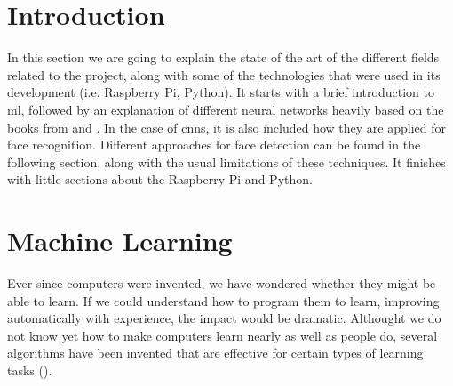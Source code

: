 
\section{Introduction}
In this section we are going to explain the state of the art of the different fields related to the project, along with some of the technologies that were used in its development (i.e. Raspberry Pi, Python). It starts with a brief introduction to \gls{ml}, followed by an explanation of different neural networks heavily based on the books from \cite{mitchell1997} and \cite{haykin2009neural}. In the case of \glspl{cnn}, it is also included how they are applied for face recognition. Different approaches for face detection can be found in the following section, along with the usual limitations of these techniques. It finishes with little sections about the Raspberry Pi and Python. 


\section{Machine Learning}
Ever since computers were invented, we have wondered whether they might be able to learn. If we could understand how to program them to learn, improving automatically with experience, the impact would be dramatic. Althought we do not know yet how to make computers learn nearly as well as people do, several algorithms have been invented that are effective for certain types of learning tasks (\cite{mitchell1997}).  

